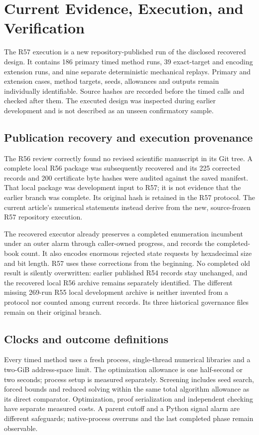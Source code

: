 \section{Current Evidence, Execution, and Verification}\label{ec:execution56}
The R57 execution is a new repository-published run of the disclosed recovered design. It contains 186 primary timed method runs, 39 exact-target and encoding extension runs, and nine separate deterministic mechanical replays. Primary and extension cases, method targets, seeds, allowances and outputs remain individually identifiable. Source hashes are recorded before the timed calls and checked after them. The executed design was inspected during earlier development and is not described as an unseen confirmatory sample.

\subsection{Publication recovery and execution provenance}
The R56 review correctly found no revised scientific manuscript in its Git tree. A complete local R56 package was subsequently recovered and its 225 corrected records and 200 certificate byte hashes were audited against the saved manifest. That local package was development input to R57; it is not evidence that the earlier branch was complete. Its original hash is retained in the R57 protocol. The current article's numerical statements instead derive from the new, source-frozen R57 repository execution.

The recovered executor already preserves a completed enumeration incumbent under an outer alarm through caller-owned progress, and records the completed-book count. It also encodes enormous rejected state requests by hexadecimal size and bit length. R57 uses these corrections from the beginning. No completed old result is silently overwritten: earlier published R54 records stay unchanged, and the recovered local R56 archive remains separately identified. The different missing 269-run R55 local development archive is neither invented from a protocol nor counted among current records. Its three historical governance files remain on their original branch.

\subsection{Clocks and outcome definitions}
Every timed method uses a fresh process, single-thread numerical libraries and a two-GiB address-space limit. The optimization allowance is one half-second or two seconds; process setup is measured separately. Screening includes seed search, forced bounds and reduced solving within the same total algorithm allowance as its direct comparator. Optimization, proof serialization and independent checking have separate measured costs. A parent cutoff and a Python signal alarm are different safeguards; native-process overruns and the last completed phase remain observable.

